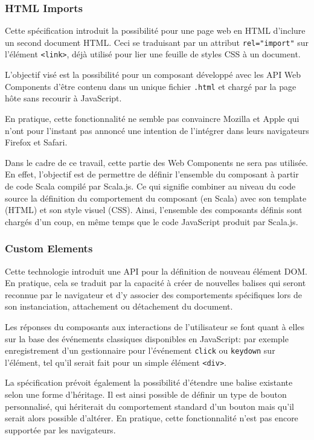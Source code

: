 \subsubsection{HTML Imports}

Cette spécification introduit la possibilité pour une page web en HTML d'inclure un second document HTML. Ceci se traduisant par un attribut \texttt{rel="import"} sur l'élément \texttt{<link>}, déjà utilisé pour lier une feuille de styles CSS à un document.

L'objectif visé est la possibilité pour un composant développé avec les API Web Components d'être contenu dans un unique fichier \texttt{.html} et chargé par la page hôte sans recourir à JavaScript.

En pratique, cette fonctionnalité ne semble pas convaincre Mozilla et Apple qui n'ont pour l'instant pas annoncé une intention de l'intégrer dans leurs navigateurs Firefox et Safari.

Dans le cadre de ce travail, cette partie des Web Components ne sera pas utilisée. En effet, l'objectif est de permettre de définir l'ensemble du composant à partir de code Scala compilé par Scala.js. Ce qui signifie combiner au niveau du code source la définition du comportement du composant (en Scala) avec son template (HTML) et son style visuel (CSS). Ainsi, l'ensemble des composants définis sont chargés d'un coup, en même temps que le code JavaScript produit par Scala.js.

\subsubsection{Custom Elements}

Cette technologie introduit une API pour la définition de nouveau élément DOM. En pratique, cela se traduit par la capacité à créer de nouvelles balises qui seront reconnue par le navigateur et d'y associer des comportements spécifiques lors de son instanciation, attachement ou détachement du document.

Les réponses du composants aux interactions de l'utilisateur se font quant à elles sur la base des événements classiques disponibles en JavaScript: par exemple enregistrement d'un gestionnaire pour l'événement \texttt{click} ou \texttt{keydown} sur l'élément, tel qu'il serait fait pour un simple élément \texttt{<div>}.

La spécification prévoit également la possibilité d'étendre une balise existante selon une forme d'héritage. Il est ainsi possible de définir un type de bouton personnalisé, qui hériterait du comportement standard d'un bouton mais qu'il serait alors possible d'altérer. En pratique, cette fonctionnalité n'est pas encore supportée par les navigateurs.

